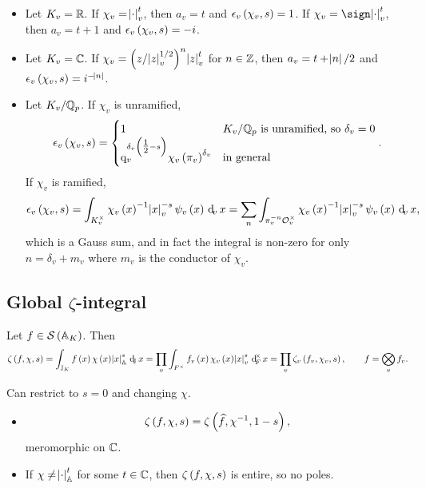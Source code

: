 \begin{itemize}
\item Let $ K_v = \mathbb{R} $. If $ \chi_v = \abs{\cdot}_v^t $, then $ a_v = t $ and $ \epsilon_v\br{\chi_v, s} = 1 $. If $ \chi_v = \sign\abs{\cdot}_v^t $, then $ a_v = t + 1 $ and $ \epsilon_v\br{\chi_v, s} = -i $.
\item Let $ K_v = \mathbb{C} $. If $ \chi_v = \br{z / \abs{z}_v^{1 / 2}}^n\abs{z}_v^t $ for $ n \in \mathbb{Z} $, then $ a_v = t + \abs{n} / 2 $ and $ \epsilon_v\br{\chi_v, s} = i^{-\abs{n}} $.

\pagebreak

\item Let $ K_v / \mathbb{Q}_p $. If $ \chi_v $ is unramified,
$$ \epsilon_v\br{\chi_v, s} =
\begin{cases}
1 & K_v / \QQ_p \ \text{is unramified, so} \ \delta_v = 0 \\
\q_v^{\delta_v\br{\tfrac{1}{2} - s}}\chi_v\br{\pi_v}^{\delta_v} & \text{in general}
\end{cases}.
$$
If $ \chi_v $ is ramified,
$$ \epsilon_v\br{\chi_v, s} = \intv[K_v^\times]{\chi_v\br{x}^{-1}\abs{x}_v^{-s}\psi_v\br{x}}{x} = \sum_n \intv[\pi_v^{-n}\OOO_v^\times]{\chi_v\br{x}^{-1}\abs{x}_v^{-s}\psi_v\br{x}}{x}, $$
which is a Gauss sum, and in fact the integral is non-zero for only $ n = \delta_v + m_v $ where $ m_v $ is the conductor of $ \chi_v $.
\end{itemize}

\subsection{Global \texorpdfstring{$ \zeta $}{zeta}-integral}


\begin{definition*}
Let $ f \in \SSS\br{\AA_K} $. Then
$$ \zeta\br{f, \chi, s} = \intJ{f\br{x}\chi\br{x}\abs{x}_\AA^s}{x} = \prod_v \intFX{f_v\br{x}\chi_v\br{x}\abs{x}_v^s}{x} = \prod_v \zeta_v\br{f_v, \chi_v, s}, \qquad f = \bigotimes_v f_v. $$
\end{definition*}

Can restrict to $ s = 0 $ and changing $ \chi $.

\begin{theorem}
\hfill
\begin{itemize}
\item
$$ \zeta\br{f, \chi, s} = \zeta\br{\widehat{f}, \chi^{-1}, 1 - s}, $$
meromorphic on $ \mathbb{C} $.
\item If $ \chi \ne \abs{\cdot}_{\mathbb{A}}^t $ for some $ t \in \mathbb{C} $, then $ \zeta\br{f, \chi, s} $ is entire, so no poles.
\end{itemize}
\end{theorem}

